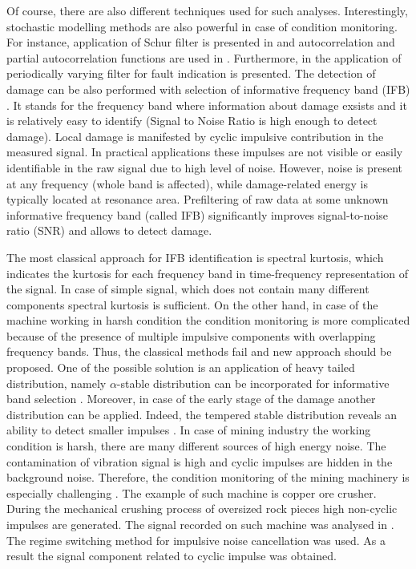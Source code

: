 \documentclass[preprint,12pt]{elsarticle}
\begin{document}
Of course, there are also different techniques used for such analyses. Interestingly, stochastic modelling methods are also powerful in case of condition monitoring. For instance, application of Schur filter is presented in \cite{Makowski2014130} and autocorrelation and partial autocorrelation functions are used in \cite{zak2014novel}. Furthermore, in \cite{kruczek2017cyclic} the application of periodically varying filter for fault indication is presented.
The detection of damage can be also performed with selection of informative frequency band (IFB) \cite{obuchowski2014selection,antoni2006spectral,combet2009optimal}. 
It stands for the frequency band where information about damage exsists and it is relatively easy to identify (Signal to Noise Ratio is high enough to detect damage). Local damage is manifested by cyclic impulsive contribution in the measured signal. In practical applications these impulses are not visible or easily identifiable in the raw signal due to high level of noise. However, noise is present at any frequency (whole band is affected), while damage-related energy is typically located at resonance area. Prefiltering of raw data at some unknown informative frequency band (called IFB) significantly improves signal-to-noise ratio (SNR) and allows to detect damage.

 
The most classical approach for IFB identification is spectral kurtosis, which indicates the kurtosis for each frequency band in time-frequency representation of the signal. In case of simple signal, which does not contain many different components spectral kurtosis is sufficient. On the other hand, in case of the machine working in harsh condition the condition monitoring is more complicated because of the presence of multiple impulsive components with overlapping frequency bands. Thus, the classical methods fail and new approach should be proposed. One of the possible solution is an application of heavy tailed distribution, namely $\alpha$-stable distribution can be incorporated for informative band selection \cite{zak2016data}. Moreover, in case of the early stage of the damage another distribution can be applied. Indeed, the tempered stable distribution reveals an ability to detect smaller impulses \cite{wylomanska2016application}. In case of mining industry the working condition is harsh, there are many different sources of high energy noise. The contamination of vibration signal is high and cyclic impulses are hidden in the background noise. Therefore, the condition monitoring of the mining machinery is especially challenging \cite{bartelmus2014object}. The example of such machine is copper ore crusher. During the mechanical crushing process of oversized rock pieces high non-cyclic impulses are generated. The signal recorded on such machine was analysed in \cite{wylomanskaimpulsive}. The regime switching method for impulsive noise cancellation was used. As a result the signal component related to cyclic impulse was obtained. 
\end{document}
